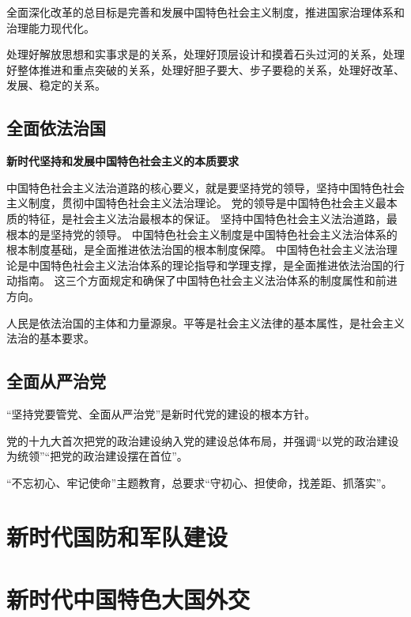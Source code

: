 \documentclass[a4paper, UTF8]{ctexart}
\begin{document}
    全面深化改革的总目标是完善和发展中国特色社会主义制度，推进国家治理体系和治理能力现代化。

    处理好解放思想和实事求是的关系，处理好顶层设计和摸着石头过河的关系，处理好整体推进和重点突破的关系，处理好胆子要大、步子要稳的关系，处理好改革、发展、稳定的关系。

    \subsection{全面依法治国}
    \textbf{新时代坚持和发展中国特色社会主义的本质要求}

    中国特色社会主义法治道路的核心要义，就是要坚持党的领导，坚持中国特色社会主义制度，贯彻中国特色社会主义法治理论。
    党的领导是中国特色社会主义最本质的特征，是社会主义法治最根本的保证。
    坚持中国特色社会主义法治道路，最根本的是坚持党的领导。
    中国特色社会主义制度是中国特色社会主义法治体系的根本制度基础，是全面推进依法治国的根本制度保障。
    中国特色社会主义法治理论是中国特色社会主义法治体系的理论指导和学理支撑，是全面推进依法治国的行动指南。
    这三个方面规定和确保了中国特色社会主义法治体系的制度属性和前进方向。

    人民是依法治国的主体和力量源泉。平等是社会主义法律的基本属性，是社会主义法治的基本要求。

    \subsection{全面从严治党}
    “坚持党要管党、全面从严治党”是新时代党的建设的根本方针。

    党的十九大首次把党的政治建设纳入党的建设总体布局，并强调“以党的政治建设为统领”“把党的政治建设摆在首位”。

    “不忘初心、牢记使命”主题教育，总要求“守初心、担使命，找差距、抓落实”。

\section{新时代国防和军队建设}

\section{新时代中国特色大国外交}
\end{document}
